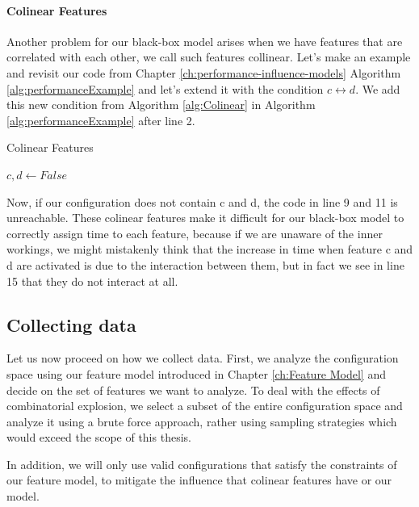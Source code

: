 \paragraph{Colinear Features}\label{ColinearF}
Another problem for our black-box model arises when we have features that are correlated with each other, we call such features collinear.
Let's make an example and revisit our code from Chapter \ref{ch:performance-influence-models} Algorithm \ref{alg:performanceExample} and let's
 extend it with the condition $c \leftrightarrow d$. We add this new condition from Algorithm \ref{alg:Colinear} in Algorithm 
\ref{alg:performanceExample} after line 2.

\begin{algorithm}
    \caption{Colinear Features \label{alg:Colinear}}
    \begin{algorithmic}[1]

        \State $c,d \gets False$
    \EndIf

    \end{algorithmic}
    \end{algorithm}

Now, if our configuration does not contain c and d, the code in line 9 and 11 is unreachable. These colinear features make it difficult 
for our black-box model to correctly assign time to each feature, because if we are unaware of the inner workings, we might mistakenly think
that the increase in time when feature c and d are activated is due to the interaction between them, but in fact we see in line
15 that they do not interact at all. %

\subsection{Collecting data}

Let us now proceed on how we collect data. First, we analyze the configuration space using our feature model introduced in Chapter \ref{ch:Feature Model}
and decide on the set of features we want to analyze. To deal with the effects of combinatorial explosion, we select a subset of the entire
configuration space and analyze it using a brute force approach, rather using sampling strategies which would exceed the scope of this
thesis.

In addition, we will only use valid configurations that satisfy the constraints of our feature model, to mitigate
the influence that colinear features have or our model.


